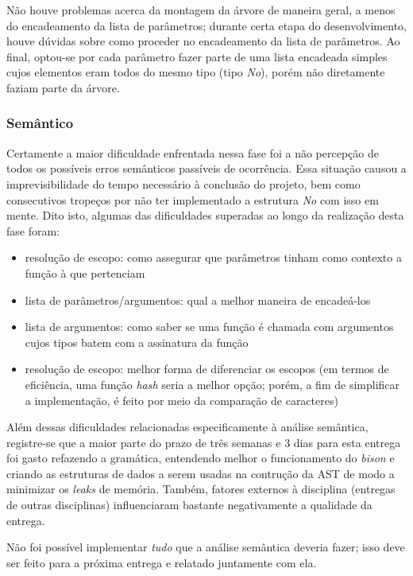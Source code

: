 \documentclass[
	article,			%
	11pt,				%
	oneside,			%
	a4paper,			%
	english,			%
	brazil,				%
	sumario=tradicional
	]{abntex2}
\renewcommand{\it}[1]{\textit{#1}}
\begin{document}
Não houve problemas acerca da montagem da árvore de maneira geral, a menos do encadeamento da lista de parâmetros; durante certa etapa do desenvolvimento, houve dúvidas sobre como proceder no encadeamento da lista de parâmetros. Ao final, optou-se por cada parâmetro fazer parte de uma lista encadeada simples cujos elementos eram todos do mesmo tipo (tipo \it{No}), porém não diretamente faziam parte da árvore.

\subsubsection{Semântico}
\label{semantico}

Certamente a maior dificuldade enfrentada nessa fase foi a não percepção de todos os possíveis erros semânticos passíveis de ocorrência. Essa situação causou a imprevisibilidade do tempo necessário à conclusão do projeto, bem como consecutivos tropeços por não ter implementado a estrutura \it{No} com isso em mente. Dito isto, algumas das dificuldades superadas ao longo da realização desta fase foram:
\begin{itemize}
	\item resolução de escopo: como assegurar que parâmetros tinham como contexto a função à que pertenciam 
	\item lista de parâmetros/argumentos: qual a melhor maneira de encadeá-los
	\item lista de argumentos: como saber se uma função é chamada com argumentos cujos tipos batem com a assinatura da função
	\item resolução de escopo: melhor forma de diferenciar os escopos (em termos de eficiência, uma função \it{hash} seria a melhor opção; porém, a fim de simplificar a implementação, é feito por meio da comparação de caracteres)
\end{itemize}
Além dessas dificuldades relacionadas especificamente à análise semântica, registre-se que a maior parte do prazo de três semanas e 3 dias para esta entrega foi gasto refazendo a gramática, entendendo melhor o funcionamento do \it{bison} e criando as estruturas de dados a serem usadas na contrução da AST de modo a minimizar os \it{leaks} de memória. Também, fatores externos à disciplina (entregas de outras disciplinas) influenciaram bastante negativamente a qualidade da entrega.

Não foi possível implementar \it{tudo} que a análise semântica deveria fazer; isso deve ser feito para a próxima entrega e relatado juntamente com ela.
\end{document}
